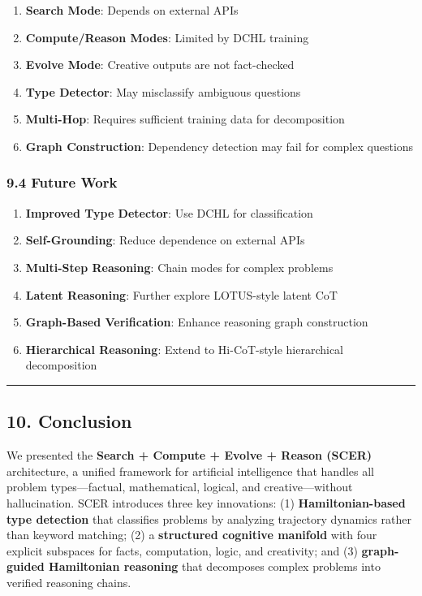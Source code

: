 \documentclass[
  11pt,
  a4paper,
]{article}
\providecommand{\tightlist}{%
  \setlength{\itemsep}{0pt}\setlength{\parskip}{0pt}}
\begin{document}
\begin{enumerate}
\def\labelenumi{\arabic{enumi}.}
\tightlist
\item
  \textbf{Search Mode}: Depends on external APIs
\item
  \textbf{Compute/Reason Modes}: Limited by DCHL training
\item
  \textbf{Evolve Mode}: Creative outputs are not fact-checked
\item
  \textbf{Type Detector}: May misclassify ambiguous questions
\item
  \textbf{Multi-Hop}: Requires sufficient training data for
  decomposition
\item
  \textbf{Graph Construction}: Dependency detection may fail for complex
  questions
\end{enumerate}

\subsubsection{9.4 Future Work}\label{future-work}

\begin{enumerate}
\def\labelenumi{\arabic{enumi}.}
\tightlist
\item
  \textbf{Improved Type Detector}: Use DCHL for classification
\item
  \textbf{Self-Grounding}: Reduce dependence on external APIs
\item
  \textbf{Multi-Step Reasoning}: Chain modes for complex problems
\item
  \textbf{Latent Reasoning}: Further explore LOTUS-style latent CoT
\item
  \textbf{Graph-Based Verification}: Enhance reasoning graph
  construction
\item
  \textbf{Hierarchical Reasoning}: Extend to Hi-CoT-style hierarchical
  decomposition
\end{enumerate}

\begin{center}\rule{0.5\linewidth}{0.5pt}\end{center}

\subsection{10. Conclusion}\label{conclusion}

We presented the \textbf{Search + Compute + Evolve + Reason (SCER)}
architecture, a unified framework for artificial intelligence that
handles all problem types---factual, mathematical, logical, and
creative---without hallucination. SCER introduces three key innovations:
(1) \textbf{Hamiltonian-based type detection} that classifies problems
by analyzing trajectory dynamics rather than keyword matching; (2) a
\textbf{structured cognitive manifold} with four explicit subspaces for
facts, computation, logic, and creativity; and (3) \textbf{graph-guided
Hamiltonian reasoning} that decomposes complex problems into verified
reasoning chains.
\end{document}
